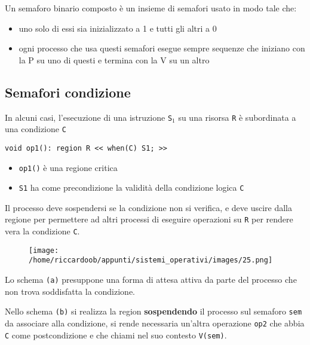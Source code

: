 \begin{mdframed}[topline=false,bottomline=false,rightline=false]
    Un semaforo binario composto è un insieme di semafori usato in modo tale che:
    \begin{itemize}
        \item uno solo di essi sia inizializzato a 1 e tutti gli altri a 0
        \item ogni processo che usa questi semafori esegue sempre sequenze che iniziano con la P su uno di questi e termina con la V su un altro
    \end{itemize}
\end{mdframed}
\subsection{Semafori condizione}
In alcuni casi, l'esecuzione di una istruzione \texttt{S}$_1$ su una risorsa \texttt{R} è subordinata a una condizione \texttt{C} 
\begin{verbatim}
void op1(): region R << when(C) S1; >>
\end{verbatim}
\begin{itemize}
    \item \texttt{op1()} è una regione critica
    \item \texttt{S1} ha come precondizione la validità della condizione logica \texttt{C}
\end{itemize}

Il processo deve sospendersi se la condizione non si verifica, e deve uscire dalla regione per permettere ad altri processi di eseguire operazioni su \texttt{R} per rendere vera la condizione \texttt{C}.

\begin{figure}[H]
    \centering
    \texttt{[image: /home/riccardoob/appunti/sistemi\_operativi/images/25.png]}
\end{figure}

Lo schema \texttt{(a)} presuppone una forma di attesa attiva da parte del processo che non trova soddisfatta la condizione.

Nello schema \texttt{(b)} si realizza la region \textbf{sospendendo} il processo sul semaforo \texttt{sem} da associare alla condizione, si rende necessaria un'altra operazione \texttt{op2} che abbia \texttt{C} come postcondizione e che chiami nel suo contesto \texttt{V(sem)}.

\vspace{-0.5cm}
